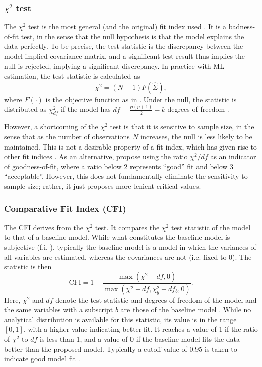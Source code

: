 \subsubsection{$\chi^2$ test}
The $\chi^2$ test is the most general (and the original) fit index used \cite{smith2001primer}. It is a badness-of-fit
test, in the sense that the null hypothesis is that the model explains the data perfectly. To be precise,
the test statistic is the discrepancy between the model-implied covariance matrix, and a significant test result
thus implies the null is rejected, implying a significant discrepancy.
In practice with ML estimation, the test statistic is calculated as
\begin{equation}
    \label{eq:methods:chi2_test_stat}
    \chi^2 = (N - 1) F(\hat{\Sigma}),
\end{equation}
where $F(\cdot)$ is the objective function as in .
Under the null, the statistic is distributed as $\chi^2_{df}$ if the model has $df = \frac{p(p + 1)}{2} - k$ degrees of freedom
\cite{zheng2025enhancing}.

However, a shortcoming of the $\chi^2$ test is that it is sensitive to sample size, in the sense that as
the number of observations $N$ increases, the null is less likely to be maintained. This is not a
desirable property of a fit index, which has given rise to other fit indices \cite{smith2001primer}.
As an alternative,  propose using the ratio $\chi^2 / df$ as an indicator of goodness-of-fit,
where a ratio below 2 represents ``good'' fit and below 3 ``acceptable''. However, this does not fundamentally eliminate
the sensitivity to sample size; rather, it just proposes more lenient critical values.

\subsubsection{Comparative Fit Index (CFI)}
The CFI derives from the $\chi^2$ test. It compares the $\chi^2$ test statistic of the model to that of a baseline model.
While what constitutes the baseline model is subjective (f.i. ), typically the baseline model is a
model in which the variances of all variables are estimated, whereas the covariances are not (i.e. fixed to 0).
The statistic is then
\begin{equation}
    \text{CFI} = 1 - \frac{\max(\chi^2 - df, 0)}{\max(\chi^2 - df, \chi^2_b - df_b, 0)}.
\end{equation}
Here, $\chi^2$ and $df$ denote the test statistic and degrees of freedom of the model and the same variables with a
subscript $b$ are those of the baseline model \cite{schermelleh2003evaluating}.
While no analytical distribution is available for this statistic, its value is in the range $[0, 1]$, with a
higher value indicating better fit. It reaches a value of 1 if the ratio of $\chi^2$ to $df$ is less than 1,
and a value of 0 if the baseline model fits the data better than the proposed model.
Typically a cutoff value of $0.95$ is taken to indicate good model fit \cite{hu1999cutoff}.


